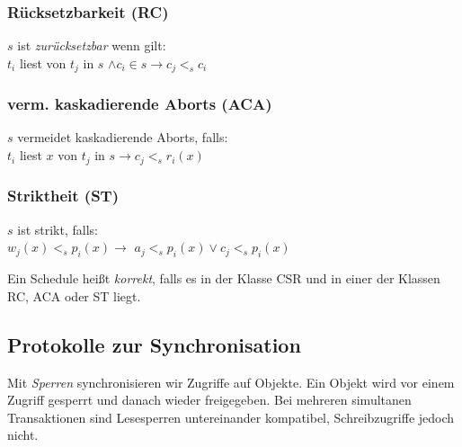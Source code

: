 \documentclass[a4paper,parskip=half*,DIV=15,fontsize=11pt]{scrartcl}
\begin{document}
\begin{minipage}[t]{0.28\textwidth}
\subsubsection*{Rücksetzbarkeit (RC)}
\begin{center}
$s$ ist \emph{zurücksetzbar} wenn gilt: \\

$t_i$ liest von $t_j$ in $s$ $\land c_i \in s \to c_j <_s c_i$
\end{center}
\end{minipage}
\hspace{0.02\textwidth}
\begin{minipage}[t]{0.4\textwidth}
\subsubsection*{verm. kaskadierende Aborts (ACA)}
\begin{center}
$s$ vermeidet kaskadierende Aborts, falls: \\

$t_i$ liest $x$ von $t_j$ in $s \to c_j <_s r_i(x)$
\end{center}
\end{minipage}
\hspace{0.02\textwidth}
\begin{minipage}[t]{0.28\textwidth}
\subsubsection*{Striktheit (ST)}
\begin{center}
$s$ ist strikt, falls: \\

$w_j(x) <_s p_i(x) \to $ $ a_j <_s p_i(x) \lor c_j <_s p_i(x)$
\end{center}
\end{minipage}
\medskip

Ein Schedule heißt \emph{korrekt}, falls es in der Klasse CSR und in einer der Klassen RC, ACA oder ST liegt.

\subsection{Protokolle zur Synchronisation}

Mit \emph{Sperren} synchronisieren wir Zugriffe auf Objekte. Ein Objekt wird vor einem Zugriff gesperrt und danach wieder freigegeben. Bei mehreren simultanen Transaktionen sind Lesesperren untereinander kompatibel, Schreibzugriffe jedoch nicht.
\end{document}
